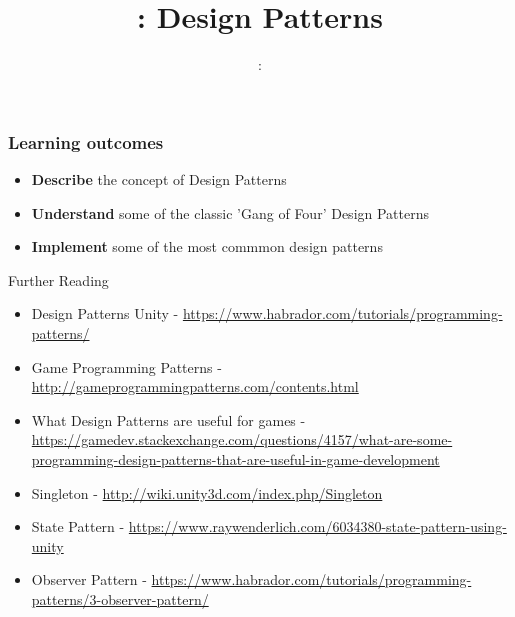 \usepackage{../../beamerthemeFalmouthGamesAcademy}
\usepackage{multimedia}
\graphicspath{ {../../} }


\usepackage[normalem]{ulem}
\usepackage{wasysym}

\usepackage{pdfpages}

\usetikzlibrary{arrows,automata}




\title{\sessionnumber: Design Patterns}
\subtitle{\modulecode: \moduletitle}

\frame{\titlepage} 

\begin{frame}
\frametitle{Learning outcomes}
\begin{itemize}
	\item \textbf{Describe} the concept of Design Patterns
	\item \textbf{Understand} some of the classic 'Gang of Four' Design Patterns
	\item \textbf{Implement} some of the most commmon design patterns
\end{itemize}
\end{frame}




\begin{frame}{Further Reading}
\begin{itemize}
	\item Design Patterns Unity - \url{https://www.habrador.com/tutorials/programming-patterns/}
	\item Game Programming Patterns - \url{http://gameprogrammingpatterns.com/contents.html}
	\item What Design Patterns are useful for games - \url{https://gamedev.stackexchange.com/questions/4157/what-are-some-programming-design-patterns-that-are-useful-in-game-development}
	\item Singleton - \url{http://wiki.unity3d.com/index.php/Singleton}
	\item State Pattern - 	\url{https://www.raywenderlich.com/6034380-state-pattern-using-unity}
	\item Observer Pattern - \url{https://www.habrador.com/tutorials/programming-patterns/3-observer-pattern/}
	
\end{itemize}
\end{frame}


